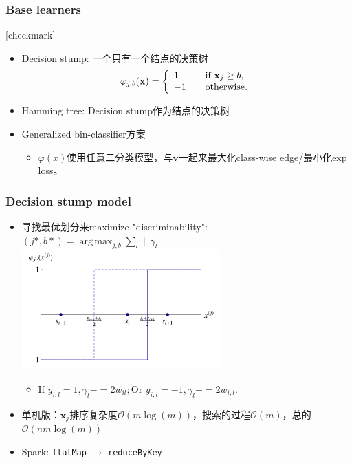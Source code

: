 \documentclass{beamer}
\DeclareMathOperator*{\argmax}{arg\,max}
\begin{document}
\begin{frame}
\frametitle{Base learners}
{
  [checkmark]
  \begin{itemize}
    \item Decision stump: 一个只有一个结点的决策树
       $$ \varphi_{j,b}(\mathbf{x}) = \left\{
            \begin{array}{l l}
              1 & \quad \text{if } \mathbf{x}_j \geq b, \\
             -1 & \quad \text{otherwise.}
            \end{array} \right.$$
    \item Hamming tree: Decision stump作为结点的决策树
    \item Generalized bin-classifier方案
      \begin{itemize}
        \item $\varphi(x)$使用任意二分类模型，与$\mathbf{v}$一起来最大化class-wise edge/最小化exp loss。
      \end{itemize}
  \end{itemize}
}
\end{frame}

\begin{frame}
\frametitle{Decision stump model}
  \begin{itemize}
    \item 寻找最优划分来maximize "discriminability": $(j*,b*) = \argmax_{j,b} \sum_{l}\| \gamma_l \|$
    \includegraphics[width=0.6\textwidth]{img/ds_split.png}
    \begin{itemize}
      \item $\text{If } y_{i,l}=1, \gamma_l -= 2w_{il}; \text{Or } y_{i,l}=-1, \gamma_l += 2w_{i,l}.$
    \end{itemize}
    \item 单机版：$\mathbf{x}_j$排序复杂度$\mathcal{O}(m\log(m))$，搜索的过程$\mathcal{O}(m)$，总的$\mathcal{O}(nm\log(m))$
    \item Spark: {\color{blue} \texttt{flatMap} $\rightarrow$ \texttt{reduceByKey}}
  \end{itemize}
\end{frame}
\end{document}
